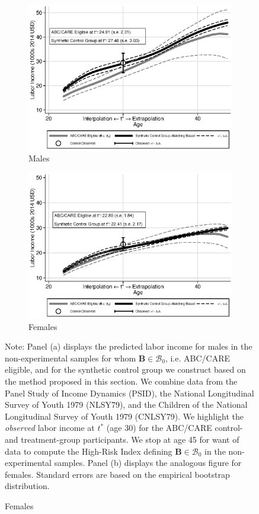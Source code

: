 \begin{figure}
\centering
\caption{Labor Income Profile, Disadvantaged Individuals Synthetic Control Group in the Non-experimental Samples}\label{figure:controltests}
\begin{subfigure}[h]{0.5\textwidth}
		\centering
		\caption{Males}
		\includegraphics[width=\textwidth]{output/abccare_disad_1.eps}
\end{subfigure}%
\begin{subfigure}[h]{0.5\textwidth}
		\centering
		\caption{Females}
		\includegraphics[width=\textwidth]{output/abccare_disad_0.eps}
\end{subfigure}
\footnotesize \justify
Note: Panel (a) displays the predicted labor income for males in the non-experimental samples for whom $\bm{B} \in \mathcal{B}_0$, i.e. ABC/CARE eligible, and for the synthetic control group we construct based on the method proposed in this section. We combine data from the Panel Study of Income Dynamics (PSID), the National Longitudinal Survey of Youth 1979 (NLSY79), and the Children of the National Longitudinal Survey of Youth 1979 (CNLSY79). We highlight the \textit{observed} labor income at $t^*$ (age 30) for the ABC/CARE control- and treatment-group participants. We stop at age 45 for want of data to compute the High-Risk Index defining $\bm{B} \in \mathcal{B}_0$ in the non-experimental samples. Panel (b) displays the analogous figure for females. Standard errors are based on the empirical bootstrap distribution.

\end{figure}
